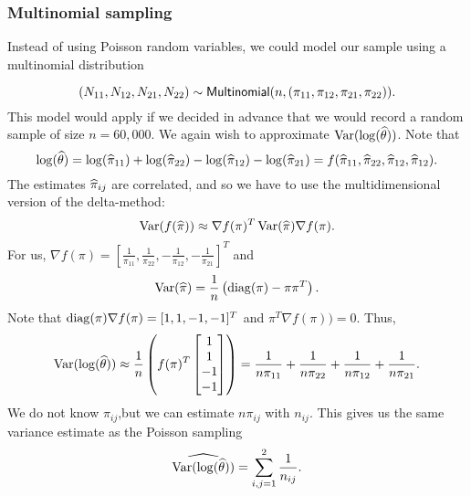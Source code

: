 \subsubsection{Multinomial sampling}
Instead of using Poisson random variables, we could model our sample using a multinomial distribution 

\[(N_{11},N_{12}, N_{21}, N_{22}) \sim \mathsf{Multinomial}(n,(\pi_{11},\pi_{12},\pi_{21}, \pi_{22})).\] 
This model would apply if we decided in advance that we would record a random sample of size $n=60,000$. We again wish to approximate $\operatorname{Var}(\log(\widehat{{\theta}}))$. Note that \[\log(\widehat{{\theta}}) = \log(\widehat{\pi}_{11})+\log(\widehat{\pi}_{22}) - \log(\widehat{\pi}_{12})-\log(\widehat{\pi}_{21}) = f(\widehat{\pi}_{11},\widehat{\pi}_{22},\widehat{\pi}_{12},\widehat{\pi}_{12}).\] The estimates $\widehat{\pi}_{ij}$ are correlated, and so we have to use the multidimensional version of the delta-method:
\[\operatorname{Var}(f(\widehat{\pi})) \approx \nabla f(\pi)^T \operatorname{Var}(\widehat{\pi}) \nabla f(\pi). \]
For us, $\nabla f(\pi) = \left[\frac{1}{\pi_{11}}, \frac{1}{\pi_{22}}, -\frac{1}{\pi_{12}}, -\frac{1}{\pi_{21}}\right]^T$ and 
\[\operatorname{Var}(\widehat{\pi}) = \frac{1}{n}\left(\operatorname{diag}(\pi)-\pi\pi^T\right). \]
Note that $\operatorname{diag}(\pi)\nabla f(\pi) = [1,1,-1,-1]^T$ and $\pi^T \nabla f(\pi))=0$. Thus,
\[\operatorname{Var}(\log(\widehat{{\theta}})) \approx \frac{1}{n}\left(f(\pi)^T \begin{bmatrix}
    1\\1\\-1\\-1
\end{bmatrix}\right)= \frac{1}{n\pi_{11}}+\frac{1}{n\pi_{22}}+\frac{1}{n\pi_{12}}+\frac{1}{n\pi_{21}}. \]
We do not know $\pi_{ij}$,but we can estimate $n\pi_{ij}$ with $n_{ij}$. This gives us the same variance estimate as the Poisson sampling
\[\widehat{\operatorname{Var}(\log(\widehat{{\theta}}))} = \sum_{i,j=1}^2 \frac{1}{n_{ij}}. \]
